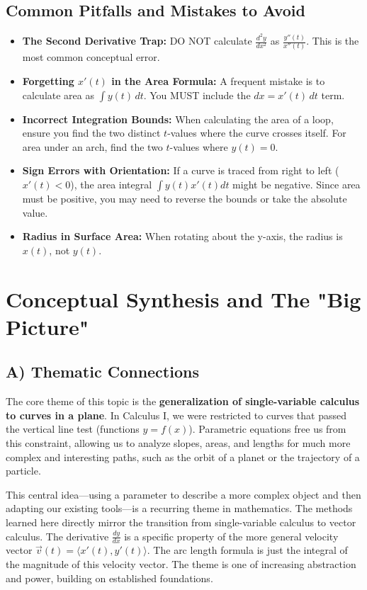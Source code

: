 \documentclass{article}
\begin{document}
\subsection{Common Pitfalls and Mistakes to Avoid}
\begin{itemize}
    \item \textbf{The Second Derivative Trap:} DO NOT calculate $\frac{d^2y}{dx^2}$ as $\frac{y''(t)}{x''(t)}$. This is the most common conceptual error.
    \item \textbf{Forgetting $x'(t)$ in the Area Formula:} A frequent mistake is to calculate area as $\int y(t) \, dt$. You MUST include the $dx = x'(t) \, dt$ term.
    \item \textbf{Incorrect Integration Bounds:} When calculating the area of a loop, ensure you find the two distinct $t$-values where the curve crosses itself. For area under an arch, find the two $t$-values where $y(t)=0$.
    \item \textbf{Sign Errors with Orientation:} If a curve is traced from right to left ($x'(t) < 0$), the area integral $\int y(t)x'(t)dt$ might be negative. Since area must be positive, you may need to reverse the bounds or take the absolute value.
    \item \textbf{Radius in Surface Area:} When rotating about the y-axis, the radius is $x(t)$, not $y(t)$.
\end{itemize}

\newpage
\section{Conceptual Synthesis and The "Big Picture"}

\subsection{A) Thematic Connections}
The core theme of this topic is the \textbf{generalization of single-variable calculus to curves in a plane}. In Calculus I, we were restricted to curves that passed the vertical line test (functions $y=f(x)$). Parametric equations free us from this constraint, allowing us to analyze slopes, areas, and lengths for much more complex and interesting paths, such as the orbit of a planet or the trajectory of a particle.

This central idea—using a parameter to describe a more complex object and then adapting our existing tools—is a recurring theme in mathematics. The methods learned here directly mirror the transition from single-variable calculus to vector calculus. The derivative $\frac{dy}{dx}$ is a specific property of the more general velocity vector $\vec{v}(t) = \langle x'(t), y'(t) \rangle$. The arc length formula is just the integral of the magnitude of this velocity vector. The theme is one of increasing abstraction and power, building on established foundations.
\end{document}
